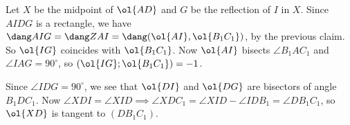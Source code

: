 Let $X$ be the midpoint of $\ol{AD}$ and $G$ be the reflection of $I$ in $X$. Since $AIDG$ is a rectangle, we have $\dang AIG=\dang ZAI=\dang (\ol{AI}, \ol{B_1C_1})$, by the previous claim. So $\ol{IG}$ coincides with $\ol{B_1C_1}$. Now $\ol{AI}$ bisects $\angle B_1AC_1$ and $\angle IAG=90^{\circ}$, so $(\ol{IG}; \ol{B_1C_1})=-1$.

Since $\angle IDG=90^{\circ}$, we see that $\ol{DI}$ and $\ol{DG}$ are bisectors of angle $B_1DC_1$. Now $\angle XDI=\angle XID \implies \angle XDC_1=\angle XID-\angle IDB_1=\angle DB_1C_1$, so $\ol{XD}$ is tangent to $(DB_1C_1)$.
